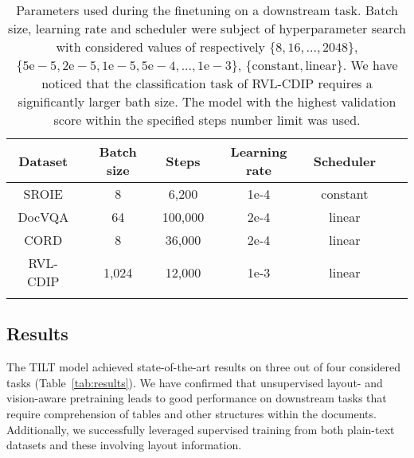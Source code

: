 \documentclass[runningheads]{llncs}
\begin{document}
\begin{table}
    \caption{Parameters used during the finetuning on a downstream task. Batch size, learning rate and scheduler were subject of hyperparameter search with considered values of respectively $\{8, 16, ..., 2048\}$, $\{\mathrm{5e-5, 2e-5, 1e-5, 5e-4, ..., 1e-3}\}$, $\{\mathrm{constant, linear}\}$. We have noticed that the classification task of RVL-CDIP requires a significantly larger bath size. The model with the highest validation score within the specified steps number limit was used. \label{tab:finetune-params}}
    \setlength{\tabcolsep}{5pt}
    \centering
    \begin{tabular}{*7c}
        \toprule
        Dataset & Batch size & Steps & Learning rate & Scheduler \\
        \midrule
        SROIE & 8 & 6,200 & 1e-4 & constant  \\
DocVQA & 64 & 100,000 & 2e-4 & linear  \\
        CORD & 8 & 36,000 & 2e-4 & linear  \\
        RVL-CDIP & 1,024 & 12,000 & 1e-3 & linear  \\
        \bottomrule  \\
    \end{tabular} 
\end{table}

\subsection{Results}

The TILT model achieved state-of-the-art results on three out of four considered tasks (Table~\ref{tab:results}). We have confirmed that unsupervised layout- and vision-aware pretraining leads to good performance on downstream tasks that require comprehension of tables and other structures within the documents. Additionally, we successfully leveraged supervised training from both plain-text datasets and these involving layout information.
\end{document}
